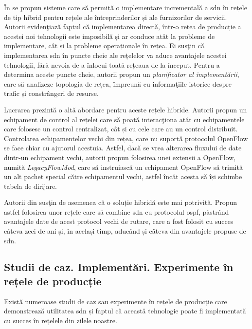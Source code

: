 În \cite{hong2016incremental, levin2013toward, canini2016panopticon} se propun sisteme care să permită o implementare incrementală a \gls{sdn} în rețele de tip hibrid pentru rețele ale întreprinderilor și ale furnizorilor de servicii. Autorii evidenţiază faptul că implementarea directă, într-o rețea de producție a acestei noi tehnologii este imposibilă și ar conduce atât la probleme de implementare, cât și la probleme operaționale în rețea. Ei susţin că implementarea \gls{sdn} în puncte cheie ale rețelelor va aduce avantajele acestei tehnologii, fără nevoia de a înlocui toată rețeaua de la început. Pentru a determina aceste puncte cheie, autorii propun un \textit{planificator al implementării}, care să analizeze topologia de rețea, împreună cu informaţiile istorice despre trafic și constrângeri de resurse.

Lucrarea \cite{jin2015telekinesis} prezintă o altă abordare pentru aceste rețele hibride. Autorii propun un echipament de control al rețelei care să poată interacţiona atât cu echipamentele care folosesc un control centralizat, cât și cu cele care au un control distribuit. Controlarea echipamentelor vechi din rețea, care nu suportă protocolul OpenFlow se face chiar cu ajutorul acestuia. Astfel, dacă se vrea alterarea fluxului de date dintr-un echipament vechi, autorii propun folosirea unei extensii a OpenFlow, numită \textit{LegacyFlowMod}, care să instruiască un echipament OpenFlow să trimită un alt pachet special către echipamentul vechi, astfel încât acesta să își schimbe tabela de dirijare.

Autorii din \cite{caria2015divide, caria2016link} susţin de asemenea că o soluție hibridă este mai potrivită. Propun astfel folosirea unor rețele care să combine \gls{sdn} cu protocolul \gls{ospf}, păstrând avantajele date de acest protocol vechi de rutare, care a fost folosit cu succes câteva zeci de ani și, în același timp, aducând și câteva din avantajele propuse de \gls{sdn}.

\subsection{Studii de caz. Implementări. Experimente în rețele de producție}

Există numeroase studii de caz sau experimente în rețele de producție care demonstrează utilitatea \gls{sdn} și faptul că această tehnologie poate fi implementată cu succes în rețelele din zilele noastre.


